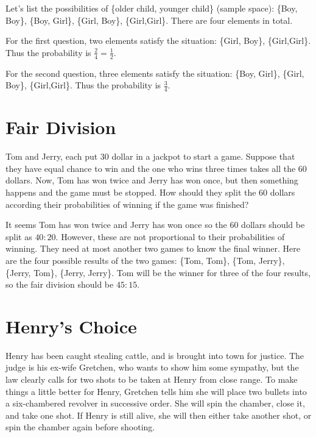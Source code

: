 Let's list the possibilities of \{older child, younger child\} (sample space):
\{Boy, Boy\}, \{Boy, Girl\}, \{Girl, Boy\}, \{Girl,Girl\}. There are four
elements in total.

For the first question, two elements satisfy the situation: \{Girl, Boy\},
\{Girl,Girl\}. Thus the probability is $\frac{2}{4}=\frac{1}{2}$.

For the second question, three elements satisfy the situation: \{Boy, Girl\},
\{Girl, Boy\}, \{Girl,Girl\}. Thus the probability is $\frac{3}{4}$.


\hypertarget{Fair-Division}{%
  \section{Fair Division}\label{Fair-Division}}

Tom and Jerry, each put 30 dollar in a jackpot to start a game. Suppose that
they have equal chance to win and the one who wins three times takes all the 60
dollars. Now, Tom has won twice and Jerry has won once, but then something
happens and the game must be stopped. How should they split the 60 dollars
according their probabilities of winning if the game was finished?

It seems Tom has won twice and Jerry has won once so the 60 dollars should be
split as $40:20$. However, these are not proportional to their probabilities of
winning. They need at most another two games to know the final winner. Here are
the four possible results of the two games: \{Tom, Tom\}, \{Tom, Jerry\},
\{Jerry, Tom\}, \{Jerry, Jerry\}. Tom will be the winner for three of the four
results, so the fair division should be $45:15$.

\hypertarget{Henry-Choice}{%
  \section{Henry's Choice}\label{Henry-Choice}}

Henry has been caught stealing cattle, and is brought into town for justice. The
judge is his ex-wife Gretchen, who wants to show him some sympathy, but the law
clearly calls for two shots to be taken at Henry from close range. To make
things a little better for Henry, Gretchen tells him she will place two bullets
into a six-chambered revolver in successive order. She will spin the chamber,
close it, and take one shot. If Henry is still alive, she will then either take
another shot, or spin the chamber again before shooting.

